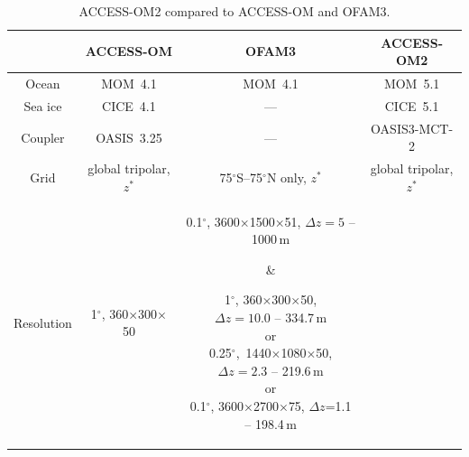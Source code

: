 \documentclass[11pt, a4paper]{article}
\begin{document}
\begin{table}%
\caption{ACCESS-OM2 compared to ACCESS-OM and OFAM3.}
\begin{center}
\begin{tabular}{|c|c|c|c|}
\hline
& \textbf{ACCESS-OM} & \textbf{OFAM3} & \textbf{ACCESS-OM2}\\
\hline
Ocean & MOM~4.1 & MOM~4.1 & MOM~5.1\\
Sea ice & CICE~4.1 & --- & CICE~5.1\\
Coupler & OASIS~3.25 & --- & OASIS3-MCT-2\\
Grid & global tripolar, $z^*$ & 75$^\circ$S--75$^\circ$N only, $z^*$ & global tripolar, $z^*$\\[2ex]
Resolution & 
1$^\circ$, 360$\times$300$\times$50 & 
\parbox[][][c]{22ex}{%
0.1$^\circ$, 3600$\times$1500$\times$51, $\Delta z=5$ -- 1000\,m 
} &
\parbox[][][c]{22ex}{%
1$^\circ$, 360$\times$300$\times$50,\\$\Delta z=10.0$ -- 334.7\,m\\
or\\0.25$^\circ$,~1440$\times$1080$\times$50,\\$\Delta z=2.3$ -- 219.6\,m\\
or\\0.1$^\circ$, 3600$\times$2700$\times$75, $\Delta z$=1.1 -- 198.4\,m\\[-1ex]}\\
\hline
\end{tabular}
\end{center}
\label{T:access-om-ofam3-access-om2}
\end{table}
\end{document}
